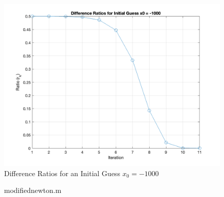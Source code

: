 \documentclass[11pt]{article}
\begin{document}
\begin{figure}[h!]
  \centering
  \includegraphics[width=0.8\linewidth]{estimate_convergence.png}
  \caption{Difference Ratios for an Initial Guess $x_0 = -1000$}
  \label{fig:estimate_convergence}
\end{figure}

\begin{figure}[h!]
  \centering
  
  \caption{modifiednewton.m}
  \label{fig:modifiednewton}
\end{figure}

\end{document}
